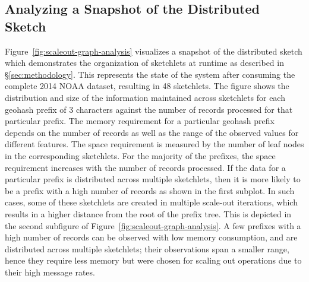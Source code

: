 \subsection{Analyzing a Snapshot of the Distributed Sketch}
Figure~\ref{fig:scaleout-graph-analysis} visualizes a snapshot of the distributed sketch which demonstrates the organization of sketchlets at runtime as described in \S\ref{sec:methodology}. 
This represents the state of the system after consuming the complete 2014 NOAA dataset, resulting in 48 sketchlets. 
The figure shows the distribution and size of the information maintained across sketchlets for each geohash prefix of 3 characters against the number of records processed for that particular prefix.
The memory requirement for a particular geohash prefix depends on the number of records as well as the range of the observed values for different features.
The space requirement is measured by the number of leaf nodes in the corresponding sketchlets.
For the majority of the prefixes, the space requirement increases with the number of records processed.
If the data for a particular prefix is distributed across multiple sketchlets, then it is more likely to be a prefix with a high number of records as shown in the first subplot.
In such cases, some of these sketchlets are created in multiple scale-out iterations, which results in a higher distance from the root of the prefix tree. This is depicted in the second subfigure of Figure~\ref{fig:scaleout-graph-analysis}.
A few prefixes with a high number of records can be observed with low memory consumption, and are distributed across multiple sketchlets; their observations span a smaller range, hence they require less memory but were chosen for scaling out operations due to their high message rates. 

